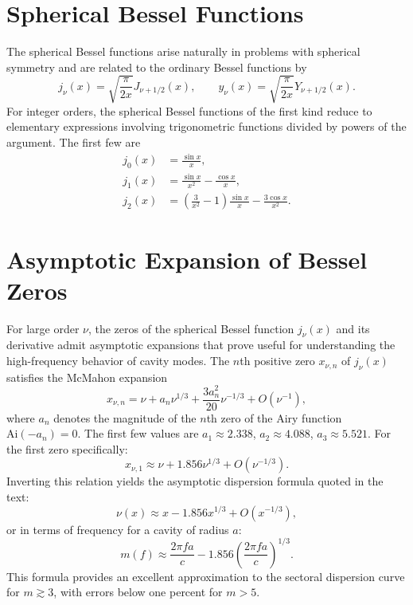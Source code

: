 \documentclass[
  aip,
  amsmath,amssymb,
  preprint
]{revtex4-1}
\begin{document}
\section{Spherical Bessel Functions}
\label{app:bessel}
The spherical Bessel functions arise naturally in problems with spherical symmetry and are related to the ordinary Bessel functions by
\begin{equation}
j_\nu(x) = \sqrt{\frac{\pi}{2x}}J_{\nu+1/2}(x), \qquad y_\nu(x) = \sqrt{\frac{\pi}{2x}}Y_{\nu+1/2}(x).
\label{eq:spherical_bessel_def}
\end{equation}
For integer orders, the spherical Bessel functions of the first kind reduce to elementary expressions involving trigonometric functions divided by powers of the argument. The first few are
\begin{align}
j_0(x) &= \frac{\sin x}{x}, \label{eq:j0}\\
j_1(x) &= \frac{\sin x}{x^2} - \frac{\cos x}{x}, \label{eq:j1}\\
j_2(x) &= \left(\frac{3}{x^2} - 1\right)\frac{\sin x}{x} - \frac{3\cos x}{x^2}. \label{eq:j2}
\end{align}


\section{Asymptotic Expansion of Bessel Zeros}
\label{app:zeros}
For large order $\nu$, the zeros of the spherical Bessel function $j_\nu(x)$ and its derivative admit asymptotic expansions that prove useful for understanding the high-frequency behavior of cavity modes.
The $n$th positive zero $x_{\nu,n}$ of $j_\nu(x)$ satisfies the McMahon expansion~\cite{Abramowitz1964, DLMF}
\begin{equation}
x_{\nu,n} = \nu + a_n\nu^{1/3} + \frac{3a_n^2}{20}\nu^{-1/3} + O(\nu^{-1}),
\label{eq:mcmahon}
\end{equation}
where $a_n$ denotes the magnitude of the $n$th zero of the Airy function $\text{Ai}(-a_n) = 0$. The first few values are $a_1 \approx 2.338$, $a_2 \approx 4.088$, $a_3 \approx 5.521$.
For the first zero specifically:
\begin{equation}
x_{\nu,1} \approx \nu + 1.856\nu^{1/3} + O(\nu^{-1/3}).
\label{eq:first_zero_asymp}
\end{equation}
Inverting this relation yields the asymptotic dispersion formula quoted in the text:
\begin{equation}
\nu(x) \approx x - 1.856 x^{1/3} + O(x^{-1/3}),
\label{eq:nu_of_x}
\end{equation}
or in terms of frequency for a cavity of radius $a$:
\begin{equation}
m(f) \approx \frac{2\pi f a}{c} - 1.856\left(\frac{2\pi f a}{c}\right)^{1/3}.
\label{eq:dispersion_asymp}
\end{equation}
This formula provides an excellent approximation to the sectoral dispersion curve for $m \gtrsim 3$, with errors below one percent for $m > 5$.
\end{document}
